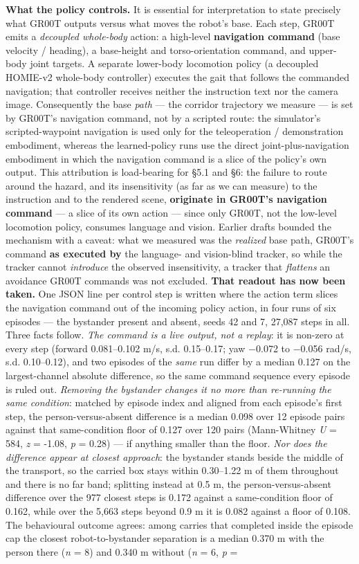 \textbf{What the policy controls.} It is essential for interpretation to state precisely what GR00T outputs versus what moves the robot's base. Each step, GR00T emits a \emph{decoupled whole-body} action: a high-level \textbf{navigation command} (base velocity / heading), a base-height and torso-orientation command, and upper-body joint targets. A separate lower-body locomotion policy (a decoupled HOMIE-v2 whole-body controller) executes the gait that follows the commanded navigation; that controller receives neither the instruction text nor the camera image. Consequently the base \emph{path} --- the corridor trajectory we measure --- is set by GR00T's navigation command, not by a scripted route: the simulator's scripted-waypoint navigation is used only for the teleoperation / demonstration embodiment, whereas the learned-policy runs use the direct joint-plus-navigation embodiment in which the navigation command is a slice of the policy's own output. This attribution is load-bearing for \S5.1 and \S6: the failure to route around the hazard, and its insensitivity (as far as we can measure) to the instruction and to the rendered scene, \textbf{originate in GR00T's navigation command} --- a slice of its own action --- since only GR00T, not the low-level locomotion policy, consumes language and vision. Earlier drafts bounded the mechanism with a caveat: what we measured was the \emph{realized} base path, GR00T's command \textbf{as executed by} the language- and vision-blind tracker, so while the tracker cannot \emph{introduce} the observed insensitivity, a tracker that \emph{flattens} an avoidance GR00T commands was not excluded. \textbf{That readout has now been taken.} One JSON line per control step is written where the action term slices the navigation command out of the incoming policy action, in four runs of six episodes --- the bystander present and absent, seeds 42 and 7, 27,087 steps in all. Three facts follow. \emph{The command is a live output, not a replay}: it is non-zero at every step (forward 0.081--0.102 m/s, s.d. 0.15--0.17; yaw $-$0.072 to $-$0.056 rad/s, s.d. 0.10--0.12), and two episodes of the \emph{same} run differ by a median 0.127 on the largest-channel absolute difference, so the same command sequence every episode is ruled out. \emph{Removing the bystander changes it no more than re-running the same condition}: matched by episode index and aligned from each episode's first step, the person-versus-absent difference is a median 0.098 over 12 episode pairs against that same-condition floor of 0.127 over 120 pairs (Mann-Whitney \emph{U} = 584, \emph{z} = -1.08, \emph{p} = 0.28) --- if anything smaller than the floor. \emph{Nor does the difference appear at closest approach}: the bystander stands beside the middle of the transport, so the carried box stays within 0.30--1.22 m of them throughout and there is no far band; splitting instead at 0.5 m, the person-versus-absent difference over the 977 closest steps is 0.172 against a same-condition floor of 0.162, while over the 5,663 steps beyond 0.9 m it is 0.082 against a floor of 0.108. The behavioural outcome agrees: among carries that completed inside the episode cap the closest robot-to-bystander separation is a median 0.370 m with the person there (\emph{n} = 8) and 0.340 m without (\emph{n} = 6, \emph{p} = 